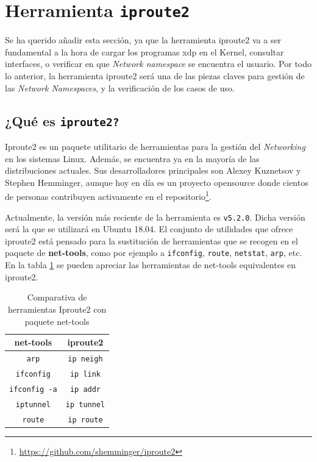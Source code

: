 \section{Herramienta \texttt{iproute2}}
\label{iproute2}
 Se ha querido añadir esta sección, ya que la herramienta iproute2 va a ser fundamental a la hora de cargar los programas \gls{xdp} en el Kernel, consultar interfaces, o verificar en que \textit{Network namespace} se encuentra el usuario. Por todo lo anterior, la herramienta iproute2 será una de las piezas claves para gestión de las \textit{Network Namespaces}, y la verificación de los casos de uso. 



\subsection{¿Qué es \texttt{iproute2?}}

Iproute2 es un paquete utilitario de herramientas para la gestión del \textit{Networking} en los sistemas Linux. Además, se encuentra ya en la mayoría de las distribuciones actuales. Sus desarrolladores principales son Alexey Kuznetsov y Stephen Hemminger, aunque hoy en día es un proyecto opensource donde cientos de personas contribuyen activamente en el repositorio\footnote{\url{https://github.com/shemminger/iproute2}}.  \\
\par
Actualmente, la versión más reciente de la herramienta es \texttt{v5.2.0}. Dicha versión será la que se utilizará en Ubuntu 18.04. El conjunto de utilidades que ofrece iproute2 está pensado para la sustitución de herramientas que se recogen en el paquete de \textbf{net-tools}, como por ejemplo a \texttt{ifconfig}, \texttt{route}, \texttt{netstat}, \texttt{arp}, etc. En la tabla \ref{tab:ipNettools} se pueden apreciar las herramientas de net-tools equivalentes en iproute2.

\begin{table}[ht]
\centering
\begin{tabular}{|c|c|}
\hline
\rowcolor[HTML]{C0C0C0} 
{\color[HTML]{000000} \textbf{net-tools}} & {\color[HTML]{000000} \textbf{iproute2}} \\ \hline
\texttt{arp}                                       & \texttt{ip neigh}                                 \\ \hline
\texttt{ifconfig}                                  & \texttt{ip link}                                  \\ \hline
\texttt{ifconfig -a}                               & \texttt{ip addr}                                  \\ \hline
\texttt{iptunnel}                                  & \texttt{ip tunnel}                                \\ \hline
\texttt{route}                                     & \texttt{ip route}                                 \\ \hline
\end{tabular}
\caption{Comparativa de herramientas Iproute2 con paquete net-tools}
\label{tab:ipNettools}
\end{table}

